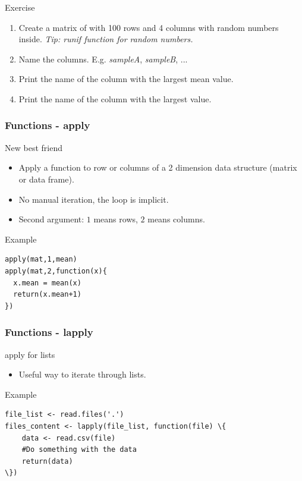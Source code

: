 \documentclass[10pt]{beamer}
\newenvironment{xframe}[2][]
  {\begin{frame}[fragile,environment=xframe,#1]
  \frametitle{#2}}
  {\end{frame}}
\begin{document}

\begin{frame}{Exercise}
  \begin{enumerate}
  \item Create a matrix of with 100 rows and 4 columns with random numbers inside. {\scriptsize\it Tip: {\sf runif} function for random numbers.}
  \item Name the columns. E.g. {\it sampleA}, {\it sampleB}, ...
  \item Print the name of the column with the largest mean value.
  \item Print the name of the column with the largest value.
  \end{enumerate}
\end{frame}


\begin{xframe}{Functions - {\sf apply}}
  \begin{block}{New best friend}
    \begin{itemize}
    \item Apply a function to row or columns of a 2 dimension data structure (matrix or data frame).
    \item No manual iteration, the loop is implicit.
    \item Second argument: $1$ means rows, $2$ means columns.
    \end{itemize}
  \end{block}
  \begin{exampleblock}{Example}
\begin{verbatim}
apply(mat,1,mean)
apply(mat,2,function(x){
  x.mean = mean(x)
  return(x.mean+1)
})
\end{verbatim}  
  \end{exampleblock}
\end{xframe}


\begin{xframe}{Functions - {\sf lapply}}
  \begin{block}{apply for lists}
    \begin{itemize}
    \item Useful way to iterate through lists.
    \end{itemize}
  \end{block}
  \begin{exampleblock}{Example}
\begin{verbatim}
file_list <- read.files('.')
files_content <- lapply(file_list, function(file) \{
	data <- read.csv(file)
	#Do something with the data
	return(data)
\})
\end{verbatim}  
  \end{exampleblock}
\end{xframe}
\end{document}
